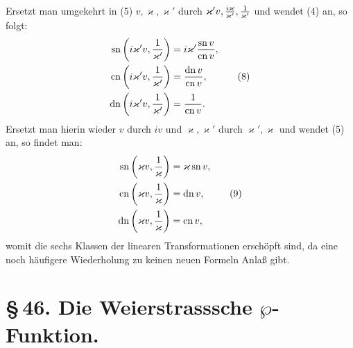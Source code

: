 \documentclass[11pt]{article}
\providecommand{\sn}{\operatorname{sn}}
\providecommand{\cn}{\operatorname{cn}}
\providecommand{\dn}{\operatorname{dn}}
\begin{document}
Ersetzt man umgekehrt in (5) $v,\varkappa,\varkappa'$ durch $\varkappa'v,{i\varkappa\over\varkappa'},{1\over\varkappa'}$ und wendet (4) an, so folgt:
\begin{equation}
\begin{aligned}
\sn\left(i\varkappa'v,{1\over\varkappa'}\right)&=i\varkappa'{\sn v\over\cn v},\\
\cn\left(i\varkappa'v,{1\over\varkappa'}\right)&={\dn v\over\cn v},\\
\dn\left(i\varkappa'v,{1\over\varkappa'}\right)&={1\over\cn v}.
\end{aligned}
\tag{8}
\end{equation}
Ersetzt man hierin wieder $v$ durch $iv$ und $\varkappa,\varkappa'$ durch $\varkappa',\varkappa$ und wendet (5) an, so findet man:
\begin{equation}
\begin{aligned}
\sn\left(\varkappa v,{1\over\varkappa}\right)&=\varkappa\sn v,\\
\cn\left(\varkappa v,{1\over\varkappa}\right)&=\dn v,\\
\dn\left(\varkappa v,{1\over\varkappa}\right)&=\cn v,
\end{aligned}
\tag{9}
\end{equation}
womit die sechs Klassen der linearen Transformationen erschöpft sind, da eine noch häufigere Wiederholung zu keinen neuen Formeln Anlaß gibt.


\clearpage
\section*{\S\,46. Die Weierstrasssche $\wp$-Funktion.}
\end{document}
